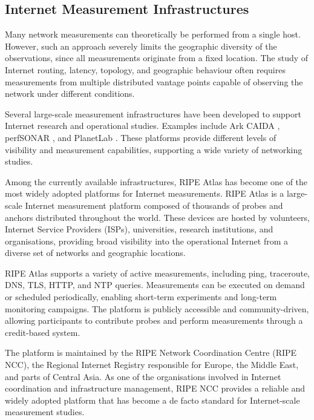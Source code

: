 \subsection{Internet Measurement Infrastructures}
\label{sc:background_location_measurements_infraestructures}

Many network measurements can theoretically be performed from a single host. However, such an approach severely limits the geographic diversity of the observations, since all measurements originate from a fixed location. The study of Internet routing, latency, topology, and geographic behaviour often requires measurements from multiple distributed vantage points capable of observing the network under different conditions.

Several large-scale measurement infrastructures have been developed to support Internet research and operational studies. Examples include Ark CAIDA \cite{ArkCAIDA}, perfSONAR \cite{PerfSONAR}, and PlanetLab \cite{HomePlanetLab}. These platforms provide different levels of visibility and measurement capabilities, supporting a wide variety of networking studies.

Among the currently available infrastructures, RIPE Atlas \cite{HomeAtlas} has become one of the most widely adopted platforms for Internet measurements. RIPE Atlas is a large-scale Internet measurement platform composed of thousands of probes and anchors distributed throughout the world. These devices are hosted by volunteers, Internet Service Providers (ISPs), universities, research institutions, and organisations, providing broad visibility into the operational Internet from a diverse set of networks and geographic locations.

RIPE Atlas supports a variety of active measurements, including ping, traceroute, DNS, TLS, HTTP, and NTP queries. Measurements can be executed on demand or scheduled periodically, enabling short-term experiments and long-term monitoring campaigns. The platform is publicly accessible and community-driven, allowing participants to contribute probes and perform measurements through a credit-based system.

The platform is maintained by the RIPE Network Coordination Centre (RIPE NCC), the Regional Internet Registry responsible for Europe, the Middle East, and parts of Central Asia. As one of the organisations involved in Internet coordination and infrastructure management, RIPE NCC provides a reliable and widely adopted platform that has become a de facto standard for Internet-scale measurement studies.

